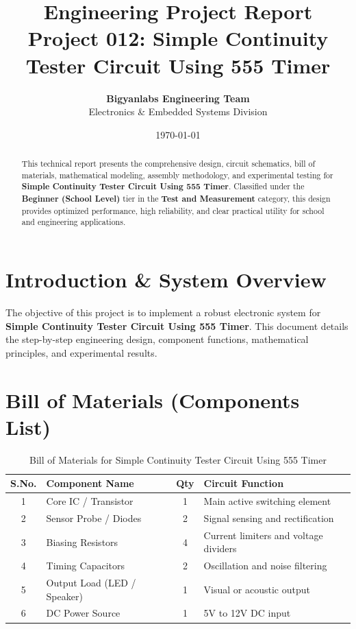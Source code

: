 \documentclass[11pt,a4paper]{article}
\title{\textbf{\Huge Engineering Project Report}\\[0.5em] \Large Project 012: Simple Continuity Tester Circuit Using 555 Timer}
\author{\textbf{Bigyanlabs Engineering Team}\\ Electronics \& Embedded Systems Division}
\date{\today}
\begin{document}
\maketitle
\thispagestyle{empty}

\begin{abstract}
This technical report presents the comprehensive design, circuit schematics, bill of materials, mathematical modeling, assembly methodology, and experimental testing for \textbf{Simple Continuity Tester Circuit Using 555 Timer}. Classified under the \textbf{Beginner (School Level)} tier in the \textbf{Test and Measurement} category, this design provides optimized performance, high reliability, and clear practical utility for school and engineering applications.
\end{abstract}

\newpage
\tableofcontents
\newpage

\section{Introduction \& System Overview}
The objective of this project is to implement a robust electronic system for \textbf{Simple Continuity Tester Circuit Using 555 Timer}. This document details the step-by-step engineering design, component functions, mathematical principles, and experimental results.

\section{Bill of Materials (Components List)}
\begin{table}[h!]
\centering
\caption{Bill of Materials for Simple Continuity Tester Circuit Using 555 Timer}
\vspace{0.5em}
\begin{tabular}{clcp{7cm}}
\toprule
\textbf{S.No.} & \textbf{Component Name} & \textbf{Qty} & \textbf{Circuit Function} \\
\midrule
1 & Core IC / Transistor & 1 & Main active switching element \\
2 & Sensor Probe / Diodes & 2 & Signal sensing and rectification \\
3 & Biasing Resistors & 4 & Current limiters and voltage dividers \\
4 & Timing Capacitors & 2 & Oscillation and noise filtering \\
5 & Output Load (LED / Speaker) & 1 & Visual or acoustic output \\
6 & DC Power Source & 1 & 5V to 12V DC input \\
\bottomrule
\end{tabular}
\end{table}
\end{document}
